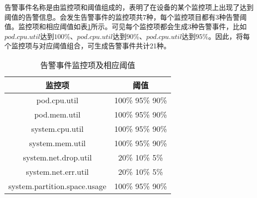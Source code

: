 告警事件名称是由监控项和阈值组成的，表明了在设备的某个监控项上出现了达到阈值的告警信息。会发生告警事件的监控项共7种，每个监控项目都有3种告警阈值。监控项和相应阈值如表\ref{alarm-event}所示。可见每个监控项都会生成3种告警事件，比如$pod.cpu.util$达到$100\%$、$pod.cpu.util$达到$90\%$、$pod.cpu.util$达到$95\%$。因此，将每个监控项与对应阈值组合，可生成告警事件共计21种。
\begin{table}[htbp]
    \centering
    \caption{告警事件监控项及相应阈值}
    \label{alarm-event}
    \begin{tabular}{cc}
    \toprule[1.5pt]
    监控项                          & 阈值              \\ \midrule[1.5pt]
    pod.cpu.util                 & 100\% 95\% 90\% \\
    pod.mem.util                 & 100\% 95\% 90\% \\
    system.cpu.util              & 100\% 95\% 90\% \\
    system.mem.util              & 100\% 95\% 90\% \\
    system.net.drop.util         & 20\% 10\% 5\%   \\
    system.net.err.util          & 20\% 10\% 5\%   \\
    system.partition.space.usage & 100\% 95\% 90\% \\ \bottomrule[1.5pt]
    \end{tabular}
\end{table}

